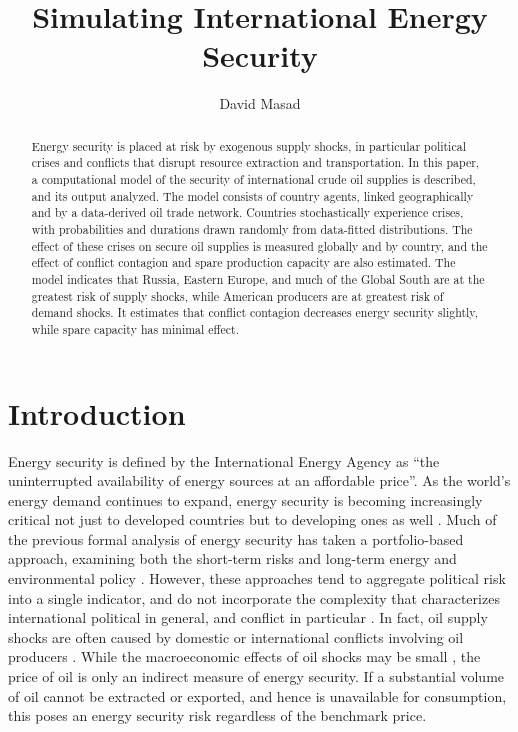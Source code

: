 \documentclass{llncs}
\begin{document}
\title{Simulating International Energy Security}
	\author{David Masad}
	\maketitle


\begin{abstract}
Energy security is placed at risk by exogenous supply shocks, in particular political crises and conflicts that disrupt resource extraction and transportation. In this paper, a computational model of the security of international crude oil supplies is described, and its output analyzed. The model consists of country agents, linked geographically and by a data-derived oil trade network. Countries stochastically experience crises, with probabilities and durations drawn randomly from data-fitted distributions. The effect of these crises on secure oil supplies is measured globally and by country, and the effect of conflict contagion and spare production capacity are also estimated. The model indicates that Russia, Eastern Europe, and much of the Global South are at the greatest risk of supply shocks, while American producers are at greatest risk of demand shocks. It estimates that conflict contagion decreases energy security slightly, while spare capacity has minimal effect. 
\end{abstract}

\section{Introduction}

Energy security is defined by the International Energy Agency as ``the uninterrupted availability of energy sources at an affordable price''\cite{iea_2013}. As the world's energy demand continues to expand, energy security is becoming increasingly critical not just to developed countries but to developing ones as well \cite{yergin_2006}. Much of the previous formal analysis of energy security has taken a portfolio-based approach, examining both the short-term risks\cite{wu_2009,jewell_2011} and long-term energy and environmental policy \cite{stirling_2010,skea_2010,jacobson_2009}. However, these approaches tend to aggregate political risk into a single indicator, and do not incorporate the complexity that characterizes international political in general, and conflict in particular \cite{cederman_1997,geller_2011}. In fact, oil supply shocks are often caused by domestic or international conflicts involving oil producers \cite{hamilton_2003}. While the macroeconomic effects of oil shocks may be small \cite{kilian_2008}, the price of oil is only an indirect measure of energy security. If a substantial volume of oil cannot be extracted or exported, and hence is unavailable for consumption, this poses an energy security risk regardless of the benchmark price. 
\end{document}
